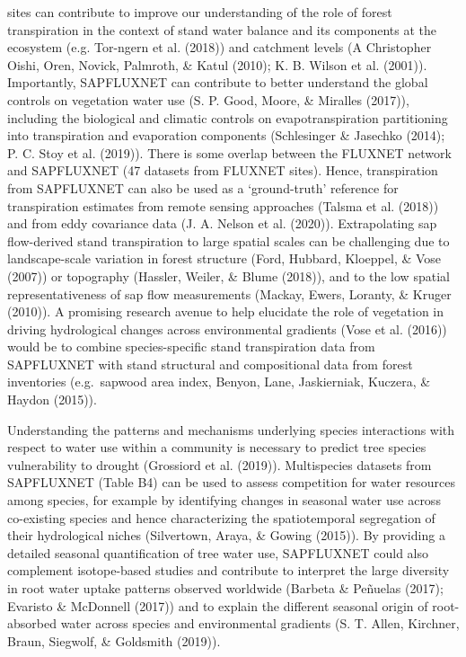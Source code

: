 \documentclass[11pt,twoside]{reedthesis}
\begin{document}
sites can contribute to improve our understanding of the role of forest
transpiration in the context of stand water balance and its components
at the ecosystem (e.g. Tor-ngern et al. (2018)) and catchment levels (A
Christopher Oishi, Oren, Novick, Palmroth, \& Katul (2010); K. B. Wilson
et al. (2001)). Importantly, SAPFLUXNET can contribute to better
understand the global controls on vegetation water use (S. P. Good,
Moore, \& Miralles (2017)), including the biological and climatic
controls on evapotranspiration partitioning into transpiration and
evaporation components (Schlesinger \& Jasechko (2014); P. C. Stoy et
al. (2019)). There is some overlap between the FLUXNET network and
SAPFLUXNET (47 datasets from FLUXNET sites). Hence, transpiration from
SAPFLUXNET can also be used as a `ground-truth' reference for
transpiration estimates from remote sensing approaches (Talsma et al.
(2018)) and from eddy covariance data (J. A. Nelson et al. (2020)).
Extrapolating sap flow-derived stand transpiration to large spatial
scales can be challenging due to landscape-scale variation in forest
structure (Ford, Hubbard, Kloeppel, \& Vose (2007)) or topography
(Hassler, Weiler, \& Blume (2018)), and to the low spatial
representativeness of sap flow measurements (Mackay, Ewers, Loranty, \&
Kruger (2010)). A promising research avenue to help elucidate the role
of vegetation in driving hydrological changes across environmental
gradients (Vose et al. (2016)) would be to combine species-specific
stand transpiration data from SAPFLUXNET with stand structural and
compositional data from forest inventories (e.g.~sapwood area index,
Benyon, Lane, Jaskierniak, Kuczera, \& Haydon (2015)).\par

Understanding the patterns and mechanisms underlying species
interactions with respect to water use within a community is necessary
to predict tree species vulnerability to drought (Grossiord et al.
(2019)). Multispecies datasets from SAPFLUXNET (Table B4) can be used to
assess competition for water resources among species, for example by
identifying changes in seasonal water use across co-existing species and
hence characterizing the spatiotemporal segregation of their
hydrological niches (Silvertown, Araya, \& Gowing (2015)). By providing
a detailed seasonal quantification of tree water use, SAPFLUXNET could
also complement isotope-based studies and contribute to interpret the
large diversity in root water uptake patterns observed worldwide
(Barbeta \& Peñuelas (2017); Evaristo \& McDonnell (2017)) and to
explain the different seasonal origin of root-absorbed water across
species and environmental gradients (S. T. Allen, Kirchner, Braun,
Siegwolf, \& Goldsmith (2019)).\par
\end{document}
